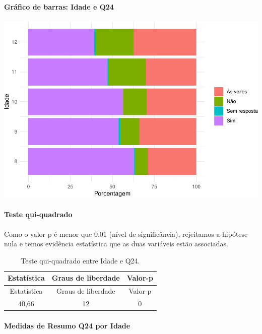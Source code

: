 \documentclass[]{article}
\let\oldparagraph\paragraph
\renewcommand{\paragraph}[1]{\oldparagraph{#1}\mbox{}}
\begin{document}
\hypertarget{gruxe1fico-de-barras-idade-e-q24}{%
\paragraph{Gráfico de barras: Idade e Q24}\label{gruxe1fico-de-barras-idade-e-q24}}

\begin{center}\includegraphics[width=0.75\linewidth]{relatorio_covid19_files/figure-latex/unnamed-chunk-624-1} \end{center}

\hypertarget{teste-qui-quadrado-54}{%
\paragraph{Teste qui-quadrado}\label{teste-qui-quadrado-54}}

Como o valor-p é menor que 0.01 (nível de significância), rejeitamos a hipótese nula e temos evidência estatística que as duas variáveis estão associadas.

\begin{longtable}[]{@{}ccc@{}}
\caption{\label{tab:unnamed-chunk-626}Teste qui-quadrado entre Idade e Q24.}\tabularnewline
\toprule
Estatística & Graus de liberdade & Valor-p\tabularnewline
\midrule
\endfirsthead
\toprule
Estatística & Graus de liberdade & Valor-p\tabularnewline
\midrule
\endhead
40,66 & 12 & 0\tabularnewline
\bottomrule
\end{longtable}

\cleardoublepage

\hypertarget{medidas-de-resumo-q24-por-idade}{%
\paragraph{Medidas de Resumo Q24 por Idade}\label{medidas-de-resumo-q24-por-idade}}
\end{document}
